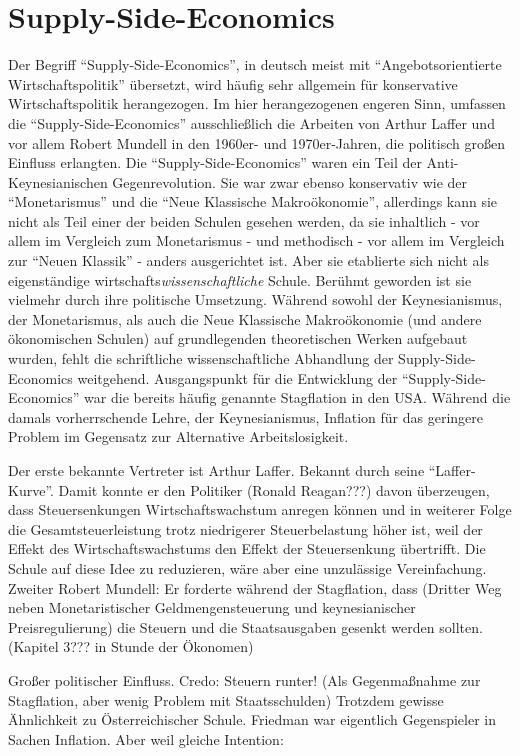 %
%
%

\chapter{Supply-Side-Economics}
\label{Supply-Side-Economics}

Der Begriff "`Supply-Side-Economics"', in deutsch meist mit "`Angebotsorientierte Wirtschaftspolitik"' übersetzt, wird häufig sehr allgemein für konservative Wirtschaftspolitik herangezogen. Im hier herangezogenen engeren Sinn, umfassen die "`Supply-Side-Economics"' ausschließlich die Arbeiten von Arthur Laffer und vor allem Robert Mundell in den 1960er- und 1970er-Jahren, die politisch großen Einfluss erlangten.
Die "`Supply-Side-Economics"' waren ein Teil der Anti-Keynesianischen Gegenrevolution. Sie war zwar ebenso konservativ wie der "`Monetarismus"' und die "`Neue Klassische Makroökonomie"', allerdings kann sie nicht als Teil einer der beiden Schulen gesehen werden, da sie inhaltlich - vor allem im Vergleich zum Monetarismus - und methodisch - vor allem im Vergleich zur "`Neuen Klassik"' -  anders ausgerichtet ist. Aber sie etablierte sich nicht als eigenständige wirtschafts\textit{wissenschaftliche} Schule. Berühmt geworden ist sie vielmehr durch ihre politische Umsetzung. Während sowohl der Keynesianismus, der Monetarismus, als auch die Neue Klassische Makroökonomie (und andere ökonomischen Schulen) auf grundlegenden theoretischen Werken aufgebaut wurden, fehlt die schriftliche wissenschaftliche Abhandlung der Supply-Side-Economics weitgehend.
Ausgangspunkt für die Entwicklung der "`Supply-Side-Economics"' war die bereits häufig genannte Stagflation in den USA.
Während die damals vorherrschende Lehre, der Keynesianismus, Inflation für das geringere Problem im Gegensatz zur Alternative Arbeitslosigkeit. 







Der erste bekannte Vertreter ist Arthur Laffer. Bekannt durch seine "`Laffer-Kurve"'. Damit konnte er den Politiker (Ronald Reagan???) davon überzeugen, dass Steuersenkungen Wirtschaftswachstum anregen können und in weiterer Folge die Gesamtsteuerleistung trotz niedrigerer Steuerbelastung höher ist, weil der Effekt des Wirtschaftswachstums den Effekt der Steuersenkung übertrifft. Die Schule auf diese Idee zu reduzieren, wäre aber eine unzulässige Vereinfachung.
Zweiter Robert Mundell: Er forderte während der Stagflation, dass (Dritter Weg neben Monetaristischer Geldmengensteuerung und keynesianischer Preisregulierung) die Steuern und die Staatsausgaben gesenkt werden sollten. (Kapitel 3??? in Stunde der Ökonomen)


Großer politischer Einfluss. Credo: Steuern runter! (Als Gegenmaßnahme zur Stagflation, aber wenig Problem mit Staatsschulden)
Trotzdem gewisse Ähnlichkeit zu Österreichischer Schule.
Friedman war eigentlich Gegenspieler in Sachen Inflation. Aber weil gleiche Intention:







